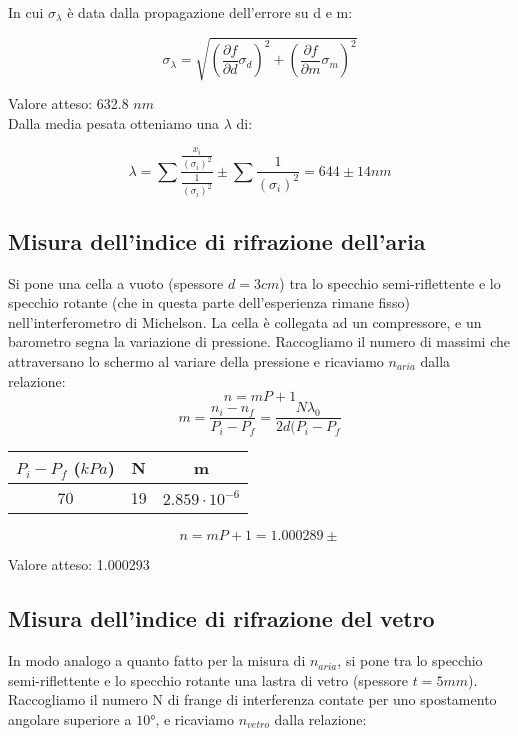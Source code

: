 In cui $\sigma_{\lambda}$ è data dalla propagazione dell'errore su d e m:

$$ \sigma_{\lambda} = \sqrt{ ( \frac{\partial f}{\partial d} \sigma_{d} )^2 + ( \frac{\partial f}{\partial m} \sigma_{m} )^2 } $$

Valore atteso: 632.8 $nm$\\

Dalla media pesata otteniamo una $\lambda$ di:

$$ \lambda =\displaystyle \sum{\frac{\frac{x_i}{(\sigma_i)^2}}{\frac{1}{(\sigma_i)^2}}} \pm \displaystyle\sum{\frac{1}{(\sigma_i)^2}} = 644 \pm 14 nm $$



\subsection{Misura dell'indice di rifrazione dell'aria}

Si pone una cella a vuoto (spessore $d=3 cm$) tra lo specchio semi-riflettente e lo specchio rotante (che in questa parte dell'esperienza rimane fisso) nell'interferometro di Michelson. La cella è collegata ad un compressore, e un barometro segna la variazione di pressione.
Raccogliamo il numero di massimi che attraversano lo schermo al variare della pressione e ricaviamo $n_{aria}$ dalla relazione:
$$ n = mP+1 $$
$$ m = \frac{n_i - n_f}{P_i-P_f} = \frac{N \lambda_0}{2d(P_i-P_f}$$

\begin{center}
\begin{tabular}{c|c|c}
$P_i-P_f$ ($kPa$) & N & m \\
\midrule
70 & 19 & $2.859\cdot10^{-6}$\\
\end{tabular}
\end{center}

$$ n = mP+1 = 1.000289 \pm $$

Valore atteso: 1.000293

\subsection{Misura dell'indice di rifrazione del vetro}

In modo analogo a quanto fatto per la misura di $n_{aria}$, si pone tra lo specchio semi-riflettente e lo specchio rotante una lastra di vetro (spessore $t= 5 mm$). Raccogliamo il numero N di frange di interferenza contate per uno spostamento angolare superiore a $10°$, e ricaviamo $n_{vetro}$ dalla relazione:

